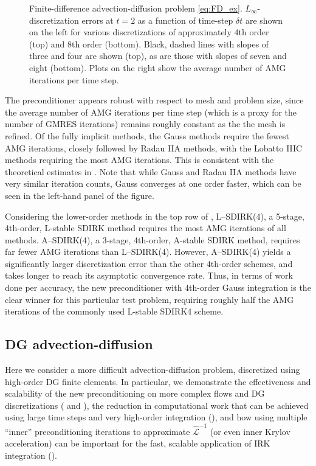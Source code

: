 \documentclass[a4paper,10pt]{article}
\begin{document}
\begin{figure}[!htb]
{}
\caption{Finite-difference advection-diffusion problem \eqref{eq:FD_ex}. $L_{\infty}$-discretization errors at $t = 2$ as a function of time-step $\delta t$ are shown on
the left for various discretizations of approximately 4th order (top) and 8th order (bottom). Black, dashed lines with slopes of three and four are shown (top), as are those with slopes of seven and eight (bottom). Plots on the right show the average number of AMG iterations per time step.
\label{fig:FD_ex}
}
\end{figure}

The preconditioner appears robust with respect to mesh and problem size, since
the average number of AMG iterations per time step (which is a proxy for the
number of GMRES iterations) remains roughly constant as the the mesh is refined.
Of the fully implicit methods, the Gauss methods require the fewest AMG iterations, closely
followed by Radau IIA methods, with the Lobatto IIIC methods requiring the most
AMG iterations. This is
consistent with the theoretical estimates in .
Note that while Gauss and Radau IIA methods have very similar
iteration counts, Gauss converges at one order faster, which can be seen in the
left-hand panel of the figure.

Considering the lower-order methods in the top
row of , L--SDIRK(4), a 5-stage, 4th-order, L-stable SDIRK
method requires the most AMG iterations of all methods. A--SDIRK(4), a 3-stage,
4th-order, A-stable SDIRK method, requires far fewer AMG iterations than
L--SDIRK(4). However, A--SDIRK(4) yields a significantly larger discretization
error than the other 4th-order schemes, and takes longer to reach its asymptotic
convergence rate. Thus, in terms of work done per accuracy, the new
preconditioner with 4th-order Gauss integration is the clear winner
for this particular test problem, requiring roughly half the AMG iterations
of the commonly used L-stable SDIRK4 scheme.

\subsection{DG advection-diffusion}\label{sec:numerics:dg}

Here we consider a more difficult advection-diffusion problem, discretized
using high-order DG finite elements. In particular, we demonstrate
the effectiveness and scalability of the new preconditioning on more complex flows and
DG discretizations ( and ),
the reduction in computational work that can be achieved using large time steps and
very high-order integration (), and how
using multiple ``inner'' preconditioning iterations to approximate $\widehat{\mathcal{L}}^{-1}$
(or even inner Krylov acceleration) can be important for the fast, scalable
application of IRK integration ().
\end{document}
